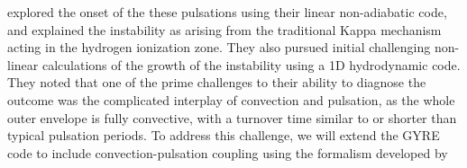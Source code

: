 \citet{1997AampA...327..224H} explored the onset of the these pulsations using
their linear non-adiabatic code, and explained the instability 
as arising from the traditional Kappa mechanism acting in the
hydrogen ionization zone. They also pursued initial challenging
non-linear calculations of the growth of the instability using a 1D 
hydrodynamic code. They noted that one of the prime challenges to
their ability to diagnose the outcome was the complicated interplay of
convection and pulsation, as the whole outer envelope is fully
convective, with a turnover time similar to or shorter than typical pulsation periods. To address this challenge, we will extend the GYRE code to include convection-pulsation coupling using the formalism developed by \citet{Houdek:2010}
